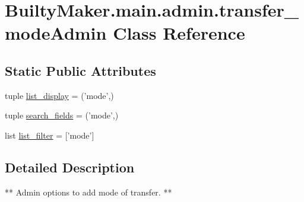 \hypertarget{classBuiltyMaker_1_1main_1_1admin_1_1transfer__modeAdmin}{\section{\-Builty\-Maker.\-main.\-admin.\-transfer\-\_\-mode\-Admin \-Class \-Reference}
\label{classBuiltyMaker_1_1main_1_1admin_1_1transfer__modeAdmin}
}
\subsection*{\-Static \-Public \-Attributes}
\begin{DoxyCompactItemize}
\item 
tuple \hyperlink{classBuiltyMaker_1_1main_1_1admin_1_1transfer__modeAdmin_a279868af897caf674491f8c476ca80ed}{list\-\_\-display} = ('mode',)
\item 
tuple \hyperlink{classBuiltyMaker_1_1main_1_1admin_1_1transfer__modeAdmin_afc86627339943d214bdf3bcb158c297a}{search\-\_\-fields} = ('mode',)
\item 
list \hyperlink{classBuiltyMaker_1_1main_1_1admin_1_1transfer__modeAdmin_a9ce28f980a54b85d0daaafcf497b48c3}{list\-\_\-filter} = \mbox{[}'mode'\mbox{]}
\end{DoxyCompactItemize}


\subsection{\-Detailed \-Description}
\begin{DoxyVerb}
        ** Admin options to add mode of transfer. **
\end{DoxyVerb}
 

